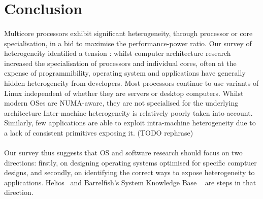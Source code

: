 \section{Conclusion}

\paragraph{}Multicore processors exhibit significant heterogeneity, through processor or core specialisation, in a bid
to maximise the performance-power ratio. Our 
survey of heterogeneity identified a tension :
whilst computer architecture research increased
the specialisation of processors and individual cores,
often at the expense of programmibility, 
operating system and applications have generally 
hidden heterogeneity from developers. Most processors 
continue to use variants of Linux independent of
whether they are servers or desktop computers. 
Whilst modern OSes are NUMA-aware, they are not specialised for the underlying architecture
Inter-machine heterogeneity is relatively poorly taken into account. Similarly, 
few applications are able to exploit intra-machine
heterogeneity due to a lack of consistent primitives exposing it. (TODO rephrase)


\paragraph{} Our survey thus suggests that OS and software research should focus on two directions:
firstly, on designing operating systems
optimised for specific comptuer designs, and secondly, 
on identifying the correct ways to expose heterogeneity
to applications. Helios~\cite{nightingale2009helios} and Barrelfish's System Knowledge Base ~\cite{schupbach08embracingdiversity} are steps in that direction. 


